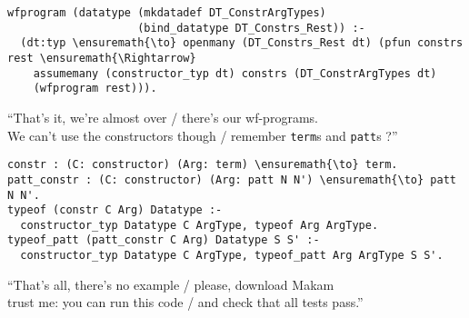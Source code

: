\begin{verbatim}
wfprogram (datatype (mkdatadef DT_ConstrArgTypes)
                    (bind_datatype DT_Constrs_Rest)) :-
  (dt:typ \ensuremath{\to} openmany (DT_Constrs_Rest dt) (pfun constrs rest \ensuremath{\Rightarrow}
    assumemany (constructor_typ dt) constrs (DT_ConstrArgTypes dt)
    (wfprogram rest))).
\end{verbatim}

\begin{versy}
``That's it, we're almost over / there's our wf-programs. \\
We can't use the constructors though / remember \texttt{term}s and \texttt{patt}s ?''
\end{versy}

\begin{verbatim}
constr : (C: constructor) (Arg: term) \ensuremath{\to} term.
patt_constr : (C: constructor) (Arg: patt N N') \ensuremath{\to} patt N N'.
typeof (constr C Arg) Datatype :-
  constructor_typ Datatype C ArgType, typeof Arg ArgType.
typeof_patt (patt_constr C Arg) Datatype S S' :-
  constructor_typ Datatype C ArgType, typeof_patt Arg ArgType S S'.
\end{verbatim}

\begin{versy}
``That's all, there's no example / please, download Makam \\
trust me: you can run this code / and check that all tests pass.''
\end{versy}
